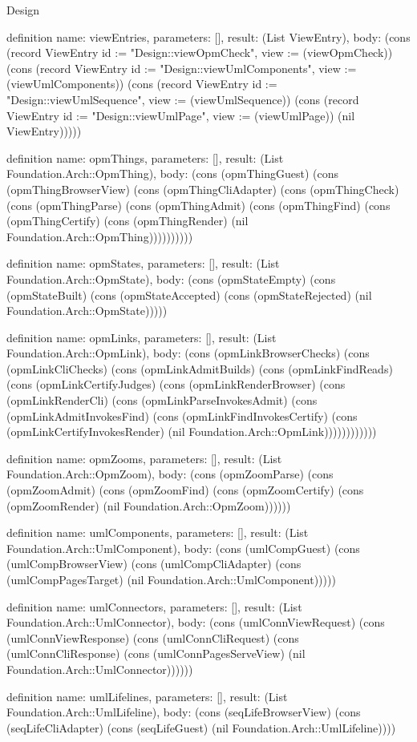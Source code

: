 \begin{lexlean}{Design}
\begin{semanticmodule}
definition{
  name: viewEntries,
  parameters: [],
  result: (List ViewEntry),
  body: (cons (record ViewEntry {id := "Design::viewOpmCheck", view := (viewOpmCheck)}) (cons (record ViewEntry {id := "Design::viewUmlComponents", view := (viewUmlComponents)}) (cons (record ViewEntry {id := "Design::viewUmlSequence", view := (viewUmlSequence)}) (cons (record ViewEntry {id := "Design::viewUmlPage", view := (viewUmlPage)}) (nil ViewEntry)))))
}

definition{
  name: opmThings,
  parameters: [],
  result: (List Foundation.Arch::OpmThing),
  body: (cons (opmThingGuest) (cons (opmThingBrowserView) (cons (opmThingCliAdapter) (cons (opmThingCheck) (cons (opmThingParse) (cons (opmThingAdmit) (cons (opmThingFind) (cons (opmThingCertify) (cons (opmThingRender) (nil Foundation.Arch::OpmThing))))))))))
}

definition{
  name: opmStates,
  parameters: [],
  result: (List Foundation.Arch::OpmState),
  body: (cons (opmStateEmpty) (cons (opmStateBuilt) (cons (opmStateAccepted) (cons (opmStateRejected) (nil Foundation.Arch::OpmState)))))
}

definition{
  name: opmLinks,
  parameters: [],
  result: (List Foundation.Arch::OpmLink),
  body: (cons (opmLinkBrowserChecks) (cons (opmLinkCliChecks) (cons (opmLinkAdmitBuilds) (cons (opmLinkFindReads) (cons (opmLinkCertifyJudges) (cons (opmLinkRenderBrowser) (cons (opmLinkRenderCli) (cons (opmLinkParseInvokesAdmit) (cons (opmLinkAdmitInvokesFind) (cons (opmLinkFindInvokesCertify) (cons (opmLinkCertifyInvokesRender) (nil Foundation.Arch::OpmLink))))))))))))
}

definition{
  name: opmZooms,
  parameters: [],
  result: (List Foundation.Arch::OpmZoom),
  body: (cons (opmZoomParse) (cons (opmZoomAdmit) (cons (opmZoomFind) (cons (opmZoomCertify) (cons (opmZoomRender) (nil Foundation.Arch::OpmZoom))))))
}

definition{
  name: umlComponents,
  parameters: [],
  result: (List Foundation.Arch::UmlComponent),
  body: (cons (umlCompGuest) (cons (umlCompBrowserView) (cons (umlCompCliAdapter) (cons (umlCompPagesTarget) (nil Foundation.Arch::UmlComponent)))))
}

definition{
  name: umlConnectors,
  parameters: [],
  result: (List Foundation.Arch::UmlConnector),
  body: (cons (umlConnViewRequest) (cons (umlConnViewResponse) (cons (umlConnCliRequest) (cons (umlConnCliResponse) (cons (umlConnPagesServeView) (nil Foundation.Arch::UmlConnector))))))
}

definition{
  name: umlLifelines,
  parameters: [],
  result: (List Foundation.Arch::UmlLifeline),
  body: (cons (seqLifeBrowserView) (cons (seqLifeCliAdapter) (cons (seqLifeGuest) (nil Foundation.Arch::UmlLifeline))))
}


\end{semanticmodule}
\end{lexlean}
